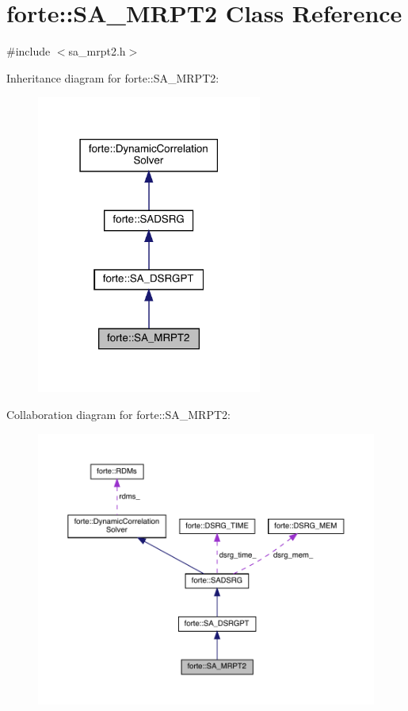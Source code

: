 \hypertarget{classforte_1_1_s_a___m_r_p_t2}{}\section{forte\+:\+:S\+A\+\_\+\+M\+R\+P\+T2 Class Reference}
\label{classforte_1_1_s_a___m_r_p_t2}


{\ttfamily \#include $<$sa\+\_\+mrpt2.\+h$>$}



Inheritance diagram for forte\+:\+:S\+A\+\_\+\+M\+R\+P\+T2\+:
\nopagebreak
\begin{figure}[H]
\begin{center}
\leavevmode
\includegraphics[width=210pt]{classforte_1_1_s_a___m_r_p_t2__inherit__graph}
\end{center}
\end{figure}


Collaboration diagram for forte\+:\+:S\+A\+\_\+\+M\+R\+P\+T2\+:
\nopagebreak
\begin{figure}[H]
\begin{center}
\leavevmode
\includegraphics[width=350pt]{classforte_1_1_s_a___m_r_p_t2__coll__graph}
\end{center}
\end{figure}
